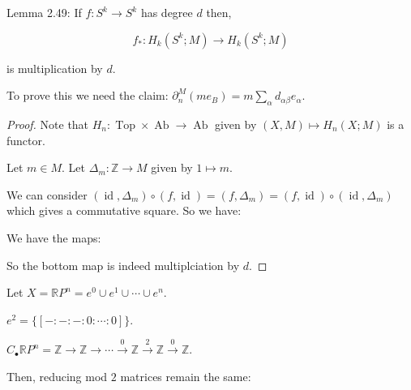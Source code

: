 \documentclass{article}
\theoremstyle{definition}
\begin{document}
    Lemma 2.49: If \(f: S^k \to S^k\) has degree \(d\) then,

    \[
        f_{\ast} : H_k(S^k;M) \to H_k(S^k;M)
    \]

    is multiplication by \(d\).

    To prove this we need the claim: \(\partial_n^M(me_B) = m \sum_{\alpha} d_{\alpha \beta} e_\alpha \).
    
    \begin{proof}
        Note that \(H_n: \operatorname{Top} \times \operatorname{Ab} \to \operatorname{Ab}\) given by \((X,M) \mapsto H_n(X;M)\) is a functor.

        Let \(m\in M\). Let \(\Delta_m:\mathbb{Z} \to M\) given by \(1 \mapsto m\).

        We can consider \((\operatorname{id}, \Delta_m) \circ (f, \operatorname{id}) = (f, \Delta_m) = (f,\operatorname{id}) \circ (\operatorname{id}, \Delta_m)\) which gives a commutative square. So we have: 

        \begin{center}
        \end{center}

        We have the maps:

        \begin{center}
        \end{center}

        So the bottom map is indeed multiplciation by \(d\).

    \end{proof}

    Let \(X = \mathbb{R} P^n = e^0 \cup e^1 \cup \cdots \cup e^n\).

    \(e^2 = \{ [-:-:-:0:\cdots :0] \}\).
    
    \(C_\bullet \mathbb{R} P^n = \mathbb{Z} \to \mathbb{Z} \to \cdots \xrightarrow{0} \mathbb{Z} \xrightarrow{2} \mathbb{Z} \xrightarrow{0} \mathbb{Z}\).

    Then, reducing mod \(2\) matrices remain the same:
\end{document}
